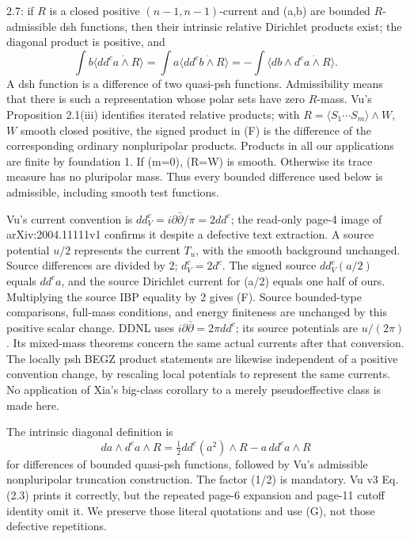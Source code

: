 \documentclass[
  11pt,
]{article}
\begin{document}
\begin{enumerate}
  2.7: if \(R\) is a closed positive \((n-1,n-1)\)-current and (a,b) are
  bounded \(R\)-admissible dsh functions, then their intrinsic relative
  Dirichlet products exist; the diagonal product is positive, and \[
  \int b\langle dd^ca\dot\wedge R\rangle
  =\int a\langle dd^cb\dot\wedge R\rangle
  =-\int\langle db\wedge d^ca\dot\wedge R\rangle.
  \tag{F}
  \] A dsh function is a difference of two quasi-psh functions.
  Admissibility means that there is such a representation whose polar
  sets have zero \(R\)-mass. Vu's Proposition 2.1(iii) identifies
  iterated relative products; with
  \(R=\langle S_1\cdots S_m\rangle\wedge W\), \(W\) smooth closed
  positive, the signed product in (F) is the difference of the
  corresponding ordinary nonpluripolar products. Products in all our
  applications are finite by foundation 1. If (m=0), (R=W) is smooth.
  Otherwise its trace measure has no pluripolar mass. Thus every bounded
  difference used below is admissible, including smooth test functions.
\end{enumerate}

Vu's current convention is \(dd^c_V=i\partial\bar\partial/\pi=2dd^c\);
the read-only page-4 image of arXiv:2004.11111v1 confirms it despite a
defective text extraction. A source potential \(u/2\) represents the
current \(T_u\), with the smooth background unchanged. Source
differences are divided by 2; \(d^c_V=2d^c\). The signed source
\(dd^c_V(a/2)\) equals \(dd^ca\), and the source Dirichlet current for
(a/2) equals one half of ours. Multiplying the source IBP equality by 2
gives (F). Source bounded-type comparisons, full-mass conditions, and
energy finiteness are unchanged by this positive scalar change. DDNL
uses \(i\partial\bar\partial=2\pi dd^c\); its source potentials are
\(u/(2\pi)\). Its mixed-mass theorems concern the same actual currents
after that conversion. The locally psh BEGZ product statements are
likewise independent of a positive convention change, by rescaling local
potentials to represent the same currents. No application of Xia's
big-class corollary to a merely pseudoeffective class is made here.

The intrinsic diagonal definition is \[
da\wedge d^ca\wedge R=\tfrac12dd^c(a^2)\wedge R-a\,dd^ca\wedge R
\tag{G}
\] for differences of bounded quasi-psh functions, followed by Vu's
admissible nonpluripolar truncation construction. The factor (1/2) is
mandatory. Vu v3 Eq. (2.3) prints it correctly, but the repeated page-6
expansion and page-11 cutoff identity omit it. We preserve those literal
quotations and use (G), not those defective repetitions.
\end{document}

